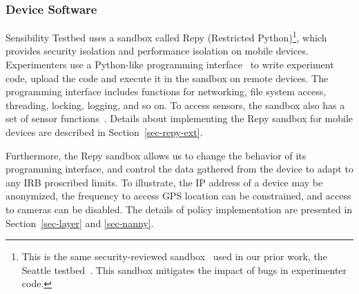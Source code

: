 \subsubsection{Device Software}\label{sec-repy}

Sensibility Testbed uses a sandbox called Repy (Restricted 
Python)\footnote{\scriptsize This is the 
same security-reviewed sandbox~\cite{cappos2010retaining} used in
our prior work, the Seattle testbed~\cite{seattle}. This sandbox
mitigates the impact of bugs in experimenter code.}, which 
provides security isolation and performance isolation on mobile devices.
Experimenters use a Python-like programming interface~\cite{repyv2}
to write experiment code, upload the code and execute it in the
sandbox on remote devices. The programming interface includes functions for networking, 
file system access, threading, locking, logging, and so on. To access sensors, 
the sandbox also has a set of sensor functions~\cite{sensors}. 
Details about implementing the Repy sandbox for mobile 
devices are described in Section~\ref{sec-repy-ext}.

Furthermore, the Repy sandbox allows us to change the 
behavior of its programming interface, and control the 
data gathered from the device to adapt to any IRB proscribed limits. 
To illustrate, the IP address of a device may be anonymized, 
the frequency to access GPS location can be constrained, and 
access to cameras can be disabled. 
The details of policy implementation are presented in 
Section~\ref{sec-layer} and \ref{sec-nanny}.

